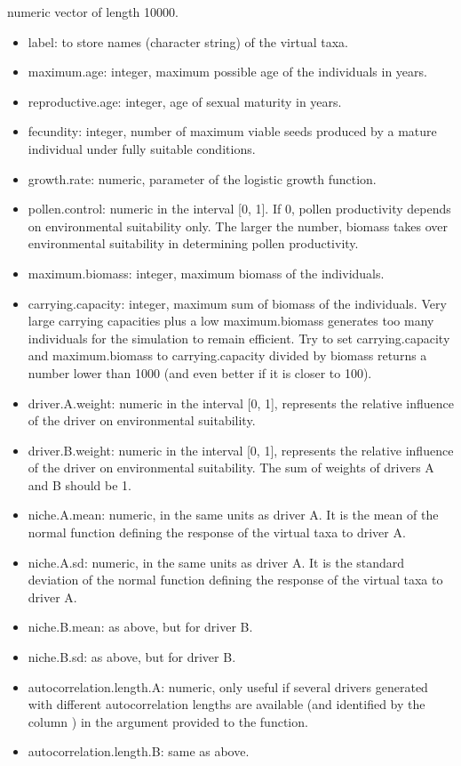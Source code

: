 \documentclass[letterpaper]{book}
\begin{document}
%
\begin{Format}
numeric vector of length 10000.
\end{Format}
%
\begin{Details}\relax
\begin{itemize}

\item label: to store names (character string) of the virtual taxa.
\item maximum.age: integer, maximum possible age of the individuals in years.
\item reproductive.age: integer, age of sexual maturity in years.
\item fecundity: integer, number of maximum viable seeds produced by a mature individual under fully suitable conditions.
\item growth.rate: numeric, parameter of the logistic growth function.
\item pollen.control: numeric in the interval [0, 1]. If 0, pollen productivity depends on environmental suitability only. The larger the number, biomass takes over environmental suitability in determining pollen productivity.
\item maximum.biomass: integer, maximum biomass of the individuals.
\item carrying.capacity: integer, maximum sum of biomass of the individuals. Very large carrying capacities plus a low maximum.biomass generates too many individuals for the simulation to remain efficient. Try to set carrying.capacity and maximum.biomass to carrying.capacity divided by biomass returns a number lower than 1000 (and even better if it is closer to 100).
\item driver.A.weight: numeric in the interval [0, 1], represents the relative influence of the driver on environmental suitability.
\item driver.B.weight: numeric in the interval [0, 1], represents the relative influence of the driver on environmental suitability. The sum of weights of drivers A and B should be 1.
\item niche.A.mean: numeric, in the same units as driver A. It is the mean of the normal function defining the response of the virtual taxa to driver A.
\item niche.A.sd: numeric, in the same units as driver A. It is the standard deviation of the normal function defining the response of the virtual taxa to driver A.
\item niche.B.mean: as above, but for driver B.
\item niche.B.sd: as above, but for driver B.
\item autocorrelation.length.A: numeric, only useful if several drivers generated with different autocorrelation lengths are available (and identified by the column ) in the  argument provided to the  function.
\item autocorrelation.length.B: same as above.

\end{itemize}

\end{Details}
\end{document}
